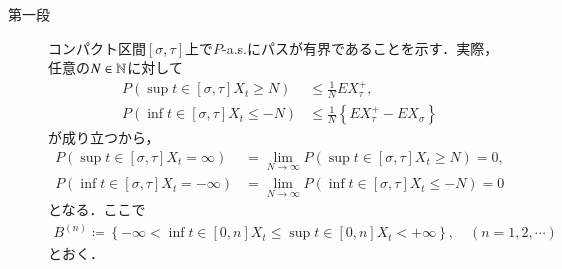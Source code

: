 	\begin{prf}\mbox{}
		\begin{description}
			\item[第一段]
				コンパクト区間$[\sigma,\tau]$上で$P$-a.s.にパスが有界であることを示す．実際，
				任意の$N \in \mathbb{N}$に対して
				\begin{align}
					P\left( \sup{t \in [\sigma,\tau]}{X_t} \geq N \right)
					&\leq \frac{1}{N} EX_\tau^+, \\
					P\left( \inf{t \in [\sigma,\tau]}{X_t} \leq -N \right)
					&\leq \frac{1}{N} \left\{ EX_\tau^+ - EX_\sigma \right\}
				\end{align}
				が成り立つから，
				\begin{align}
					P\left( \sup{t \in [\sigma,\tau]}{X_t} = \infty \right)
					&= \lim_{N \to \infty} P\left( \sup{t \in [\sigma,\tau]}{X_t} \geq N \right)
					= 0, \\
					P\left( \inf{t \in [\sigma,\tau]}{X_t} = -\infty \right)
					&= \lim_{N \to \infty} P\left( \inf{t \in [\sigma,\tau]}{X_t} \leq -N \right)
					= 0
				\end{align}
				となる．ここで
				\begin{align}
					B^{(n)} \coloneqq \left\{ -\infty < \inf{t \in [0,n]}{X_t} \leq \sup{t \in [0,n]}{X_t} < +\infty \right\},
					\quad (n=1,2,\cdots)
				\end{align}
				とおく．
			

\end{description}
\end{prf}
